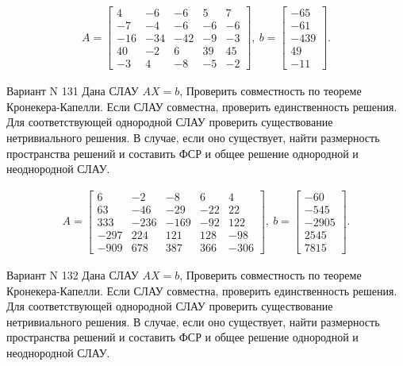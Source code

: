 \documentclass[11pt]{report}
\begin{document}
\begin{align*}
 A = \left[\begin{matrix}4 & -6 & -6 & 5 & 7\\-7 & -4 & -6 & -6 & -6\\-16 & -34 & -42 & -9 & -3\\40 & -2 & 6 & 39 & 45\\-3 & 4 & -8 & -5 & -2\end{matrix}\right],
\ b = \left[\begin{matrix}-65\\-61\\-439\\49\\-11\end{matrix}\right]. 
 \end{align*}

Вариант N 131
Дана СЛАУ $AX = b$,
Проверить совместность по теореме Кронекера-Капелли. Если СЛАУ совместна, проверить единственность решения.
Для соответствующей однородной СЛАУ проверить существование нетривиального решения. В случае, если оно существует,
найти размерность пространства решений и составить ФСР и общее решение однородной  и неоднородной СЛАУ.


\begin{align*}
 A = \left[\begin{matrix}6 & -2 & -8 & 6 & 4\\63 & -46 & -29 & -22 & 22\\333 & -236 & -169 & -92 & 122\\-297 & 224 & 121 & 128 & -98\\-909 & 678 & 387 & 366 & -306\end{matrix}\right],
\ b = \left[\begin{matrix}-60\\-545\\-2905\\2545\\7815\end{matrix}\right]. 
 \end{align*}

Вариант N 132
Дана СЛАУ $AX = b$,
Проверить совместность по теореме Кронекера-Капелли. Если СЛАУ совместна, проверить единственность решения.
Для соответствующей однородной СЛАУ проверить существование нетривиального решения. В случае, если оно существует,
найти размерность пространства решений и составить ФСР и общее решение однородной  и неоднородной СЛАУ.
\end{document}
